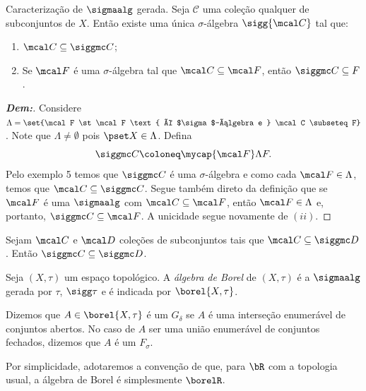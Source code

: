 \newpage
\begin{prop*}{Caracterização de $\sigmaalg$ gerada.}
  Seja $\mathscr C$ uma coleção qualquer de subconjuntos de $X$. Então
  existe uma única $\sigma$-álgebra $\sigg{\mcal C}$ tal que:
  \begin{enumerate}[label=(\roman*)]
    \item  $\mcal C \subseteq \siggmc C$;
    \item Se $\mcal F$ é uma $\sigma$-álgebra tal que $\mcal C \subseteq \mcal F$,
      então $\siggmc C \subseteq F$.
  \end{enumerate}
\end{prop*}
\begin{proof}[\textbf{Dem:}] Considere $\Lambda = \set{\mcal F \st \mcal F 
  \text{ é $\sigma$-álgebra e } \mcal C \subseteq F} $. Note que $\Lambda \neq \emptyset$
  pois $\pset X \in \Lambda$. Defina $$\siggmc C \coloneq \mycap{\mcal F} \Lambda F.$$ 
  Pelo exemplo 5 temos que $\siggmc C$ é uma $\sigma$-álgebra e como cada 
  $\mcal F \in \Lambda$, temos que $\mcal C \subseteq \siggmc C$. 
  Segue também direto da definição que se $\mcal F$ é uma $\sigmaalg$ com 
  $\mcal C \subseteq \mcal F$, então $\mcal F \in \Lambda$ e, portanto, $\siggmc C \subseteq 
  \mcal F$. A unicidade segue novamente de $(ii)$.
\end{proof}

\begin{corollary*}{}
  Sejam $\mcal C$ e $\mcal D$ coleções de subconjuntos tais que $\mcal C \subseteq \siggmc D$. 
  Então $\siggmc C \subseteq \siggmc D$.
\end{corollary*}

\begin{definition*}{}
  Seja $(X, \tau)$ um espaço topológico. A \textit{álgebra de Borel} de $(X,\tau)$ é 
  a $\sigmaalg$ gerada por $\tau$, $\sigg \tau$ e é indicada por $\borel{X, \tau}$. 
\end{definition*}
\vspace{5mm}

Dizemos que $A \in \borel{X, \tau}$ é um $G_\delta$ se $A$ é uma interseção 
enumerável de conjuntos abertos. No caso de $A$ ser uma união enumerável 
de conjuntos fechados, dizemos que $A$ é um $F_\sigma$.

Por simplicidade, adotaremos a convenção de que, para $\bR$ com a topologia usual, 
a álgebra de Borel é simplesmente $\borelR$.

